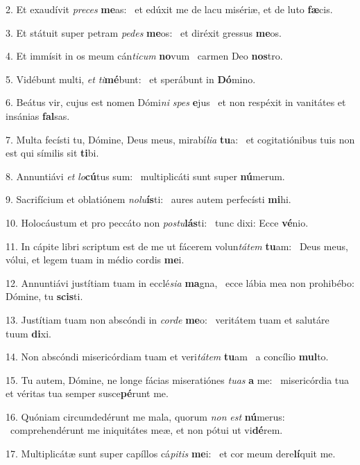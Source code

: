 2. Et exaudívit \textit{pre}\textit{ces} \textbf{me}as: \ast\  et edúxit me de lacu misériæ, et de luto \textbf{fæ}cis.\

3. Et státuit super petram \textit{pe}\textit{des} \textbf{me}os: \ast\  et diréxit gressus \textbf{me}os.\

4. Et immísit in os meum cán\textit{ti}\textit{cum} \textbf{no}vum \ast\  carmen Deo \textbf{nos}tro.\

5. Vidébunt multi, \textit{et} \textit{ti}\textbf{mé}bunt: \ast\  et sperábunt in \textbf{Dó}mino.\

6. Beátus vir, cujus est nomen Dómi\textit{ni} \textit{spes} \textbf{e}jus \ast\  et non respéxit in vanitátes et insánias \textbf{fal}sas.\

7. Multa fecísti tu, Dómine, Deus meus, mirabí\textit{li}\textit{a} \textbf{tu}a: \ast\  et cogitatiónibus tuis non est qui símilis sit \textbf{ti}bi.\

8. Annuntiávi \textit{et} \textit{lo}\textbf{cú}tus sum: \ast\  multiplicáti sunt super \textbf{nú}merum.\

9. Sacrifícium et oblatiónem \textit{no}\textit{lu}\textbf{ís}ti: \ast\  aures autem perfecísti \textbf{mi}hi.\

10. Holocáustum et pro peccáto non \textit{pos}\textit{tu}\textbf{lás}ti: \ast\  tunc dixi: Ecce \textbf{vé}nio.\

11. In cápite libri scriptum est de me ut fácerem volun\textit{tá}\textit{tem} \textbf{tu}am: \ast\  Deus meus, vólui, et legem tuam in médio cordis \textbf{me}i.\

12. Annuntiávi justítiam tuam in ecclé\textit{si}\textit{a} \textbf{ma}gna, \ast\  ecce lábia mea non prohibébo: Dómine, tu \textbf{scis}ti.\

13. Justítiam tuam non abscóndi in \textit{cor}\textit{de} \textbf{me}o: \ast\  veritátem tuam et salutáre tuum \textbf{di}xi.\

14. Non abscóndi misericórdiam tuam et veri\textit{tá}\textit{tem} \textbf{tu}am \ast\  a concílio \textbf{mul}to.\

15. Tu autem, Dómine, ne longe fácias miseratiónes \textit{tu}\textit{as} \textbf{a} me: \ast\  misericórdia tua et véritas tua semper susce\textbf{pé}runt me.\

16. Quóniam circumdedérunt me mala, quorum \textit{non} \textit{est} \textbf{nú}merus: \ast\  comprehendérunt me iniquitátes meæ, et non pótui ut vi\textbf{dé}rem.\

17. Multiplicátæ sunt super capíllos cá\textit{pi}\textit{tis} \textbf{me}i: \ast\  et cor meum dere\textbf{lí}quit me.\


